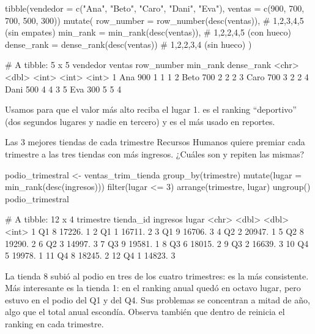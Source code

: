 \begin{rcode}
tibble(vendedor = c("Ana", "Beto", "Caro", "Dani", "Eva"),
       ventas   = c(900, 700, 700, 500, 300)) %
  mutate(
    row_number = row_number(desc(ventas)),  # 1,2,3,4,5 (sin empates)
    min_rank   = min_rank(desc(ventas)),    # 1,2,2,4,5 (con hueco)
    dense_rank = dense_rank(desc(ventas))   # 1,2,2,3,4 (sin hueco)
  )
\end{rcode}
\begin{rsalida}
# A tibble: 5 x 5
  vendedor ventas row_number min_rank dense_rank
  <chr>     <dbl>      <int>    <int>      <int>
1 Ana         900          1        1          1
2 Beto        700          2        2          2
3 Caro        700          3        2          2
4 Dani        500          4        4          3
5 Eva         300          5        5          4
\end{rsalida}

Usamos  para que el valor más alto reciba el lugar 1.
 es el ranking ``deportivo'' (dos segundos lugares y
nadie en tercero) y es el más usado en reportes.

\begin{ejemplo}{Las 3 mejores tiendas de cada trimestre}
Recursos Humanos quiere premiar cada trimestre a las tres tiendas con más
ingresos. ¿Cuáles son y repiten las mismas?
\end{ejemplo}

\begin{rcode}
podio_trimestral <- ventas_trim_tienda %
  group_by(trimestre) %
  mutate(lugar = min_rank(desc(ingresos))) %
  filter(lugar <= 3) %
  arrange(trimestre, lugar) %
  ungroup()
podio_trimestral
\end{rcode}
\begin{rsalida}
# A tibble: 12 x 4
   trimestre tienda_id ingresos lugar
   <chr>         <dbl>    <dbl> <int>
 1 Q1                8   17226.     1
 2 Q1                1   16711.     2
 3 Q1                9   16706.     3
 4 Q2                2   20947.     1
 5 Q2                8   19290.     2
 6 Q2                3   14997.     3
 7 Q3                9   19581.     1
 8 Q3                6   18015.     2
 9 Q3                2   16639.     3
10 Q4                5   19978.     1
11 Q4                8   18245.     2
12 Q4                1   14823.     3
\end{rsalida}

La tienda 8 subió al podio en tres de los cuatro trimestres: es la más
consistente. Más interesante es la tienda 1: en el ranking anual quedó en
octavo lugar, pero estuvo en el podio del Q1 y del Q4. Sus problemas se
concentran a mitad de año, algo que el total anual escondía. Observa también
que  dentro de  reinicia el
ranking en cada trimestre.

